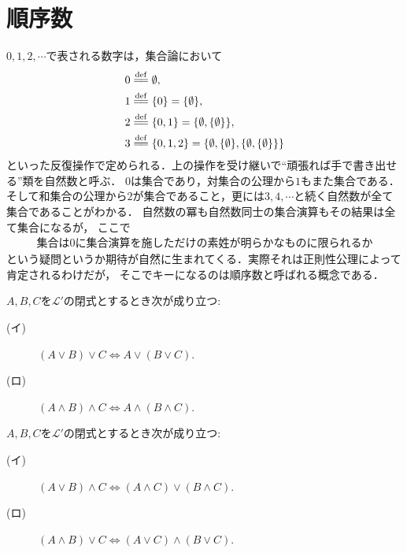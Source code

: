 \section{順序数}
	$0,1,2,\cdots$で表される数字は，集合論において
	\begin{align}
		0 &\defeq \emptyset, \\
		1 &\defeq \{0\} = \{\emptyset\}, \\
		2 &\defeq \{0,1\} = \{\emptyset,\{\emptyset\}\}, \\
		3 &\defeq \{0,1,2\} = \{\emptyset,\{\emptyset\},\{\emptyset,\{\emptyset\}\}\}
	\end{align}
	といった反復操作で定められる．上の操作を受け継いで``頑張れば手で書き出せる''類を自然数と呼ぶ．
	$0$は集合であり，対集合の公理から$1$もまた集合である．
	そして和集合の公理から$2$が集合であること，更には$3,4,\cdots$と続く自然数が全て集合であることがわかる．
	自然数の冪も自然数同士の集合演算もその結果は全て集合になるが，
	ここで
	\begin{align}
		\mbox{集合は$0$に集合演算を施しただけの素姓が明らかなものに限られるか}
	\end{align}
	という疑問というか期待が自然に生まれてくる．実際それは正則性公理によって肯定されるわけだが，
	そこでキーになるのは順序数と呼ばれる概念である．
	
	\begin{screen}
		\begin{logicalthm}\label{logicalthm:associative_law}
			$A,B,C$を$\mathcal{L}'$の閉式とするとき次が成り立つ:
			\begin{description}
				\item[(イ)] $(A \vee B) \vee C \Longleftrightarrow A \vee (B \vee C)$.
				\item[(ロ)] $(A \wedge B) \wedge C \Longleftrightarrow A \wedge (B \wedge C)$.
			\end{description}
		\end{logicalthm}
	\end{screen}
	
	\begin{screen}
		\begin{logicalthm}\label{logicalthm:distributive_law}
			$A,B,C$を$\mathcal{L}'$の閉式とするとき次が成り立つ:
			\begin{description}
				\item[(イ)] $(A \vee B) \wedge C \Longleftrightarrow (A \wedge C) \vee (B \wedge C)$.
				\item[(ロ)] $(A \wedge B) \vee C \Longleftrightarrow (A \vee C) \wedge (B \vee C)$.
			\end{description}
		\end{logicalthm}
	\end{screen}
	
